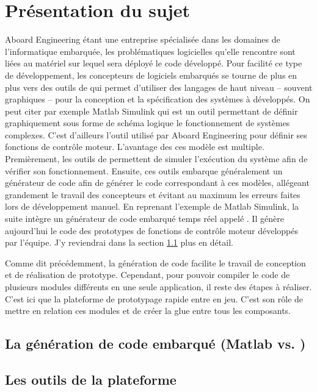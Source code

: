 \chapter{Présentation du sujet}
Aboard Engineering étant une entreprise spécialisée dans les domaines de l'informatique embarquée, les problématiques logicielles qu'elle rencontre sont liées au matériel sur lequel sera déployé le code développé. Pour facilité ce type de développement, les concepteurs de logiciels embarqués se tourne de plus en plus vers des outils de  qui permet d'utiliser des langages de haut niveau -- souvent graphiques -- pour la conception et la spécification des systèmes à développés. On peut citer par exemple Matlab\up{\circledR} Simulink\up{\circledR} qui est un outil permettant de définir graphiquement sous forme de schéma logique le fonctionnement de systèmes complexes. C'est d'ailleurs l'outil utilisé par Aboard Engineering pour définir ses fonctions de contrôle moteur. L'avantage des ces modèle est multiple. Premièrement, les outils de  permettent de simuler l'exécution du système afin de vérifier son fonctionnement. Ensuite, ces outils embarque généralement un générateur de code afin de générer le code correspondant à ces modèles, allégeant grandement le travail des concepteurs et évitant au maximum les erreurs faites lors de développement \og manuel\fg{}. En reprenant l'exemple de Matlab\up{\circledR} Simulink\up{\circledR}, la suite intègre un générateur de code embarqué temps réel appelé . Il génère aujourd'hui le code des prototypes de fonctions de contrôle moteur développés par l'équipe. J'y reviendrai dans la section \ref{sec:rtw} plus en détail.

Comme dit précédemment, la génération de code facilite le travail de conception et de réalisation de prototype. Cependant, pour pouvoir compiler le code de plusieurs modules différents en une seule application, il reste des étapes à réaliser. C'est ici que la plateforme de prototypage rapide  entre en jeu. C'est son rôle de mettre en relation ces modules et de créer la \og glue \fg{} entre tous les composants. 

\section{La génération de code embarqué (Matlab\up{\circledR}  vs. )}
\label{sec:rtw}
\lipsum

\section{Les outils de la plateforme}
\lipsum
